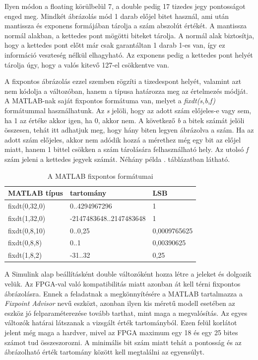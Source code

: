 Ilyen módon a floating körülbelül 7, a double pedig 17 tizedes jegy pontosságot enged meg. Mindkét ábrázolás mód 1 darab előjel bitet használ, ami után mantissza és exponens formájában tárolja a szám abszolút értékét. A mantissza normál alakban, a kettedes pont mögötti biteket tárolja. A normál alak biztosítja, hogy a kettedes pont előtt már csak garantáltan 1 darab 1-es van, így ez információ veszteség nélkül elhagyható. Az exponens pedig a kettedes pont helyét tárolja úgy, hogy a valós kitevő 127-el csökkentve van.

A fixpontos ábrázolás ezzel szemben rögzíti a tizedespont helyét, valamint azt nem kódolja a változóban, hanem a típusa határozza meg az értelmezés módját. A MATLAB-nak saját fixpontos formátuma van, melyet a \emph{fixdt(s,b,f)} formátummal használhatunk. Az \emph{s} jelöli, hogy az adott szám előjeles-e vagy sem, ha 1 az értéke akkor igen, ha 0, akkor nem. A következő \emph{b} a bitek számát jelöli összesen, tehát itt adhatjuk meg, hogy hány biten legyen ábrázolva a szám. Ha az adott szám előjeles, akkor nem adódik hozzá a mérethez még egy bit az előjel miatt, hanem 1 bittel csökken a szám tárolására felhasználható hely. Az utolsó \emph{f} szám jeleni a kettedes jegyek számát. Néhány példa . táblázatban látható.

\begin{table}[]
\centering
\begin{tabular}{|l|l|l|}
\hline
MATLAB típus  & tartomány               & LSB \\ \hline
fixdt(0,32,0) & 0..4294967296           & 1   \\ \hline
fixdt(1,32,0) & -2147483648..2147483648	& 1   \\ \hline
fixdt(0,8,10) & 0..0,25        	   	    & 0,0009765625 \\ \hline
fixdt(0,8,8)  & 0..1     			 	& 0,00390625    \\ \hline
fixdt(1,8,2)  & -31..32     			& 0,25    \\ \hline
\end{tabular}
\caption{A MATLAB fixpontos formátumai}
\label{tab:fixdt}
\end{table}

A Simulink alap beállításként double változóként hozza létre a jeleket és dolgozik velük. Az FPGA-val való kompatibilitás miatt azonban át kell térni fixpontos ábrázolásra. Ennek a feladatnak a megkönnyítésére a MATLAB tartalmazza a \emph{Fixpoint Advisor} nevű eszközt, azonban ilyen kis méretű modell esetében az eszköz jó felparaméterezése tovább tarthat, mint maga a megvalósítás. Az egyes változók határai látszanak a vizsgált érték tartományból. Ezen felül korlátot jelent még maga a hardver, mivel az FPGA maximum egy 18 és egy 25 bites számot tud összeszorozni. A minimális bit szám miatt tehát a pontosság és az ábrázolható érték tartomány között kell megtalálni az egyensúlyt.

